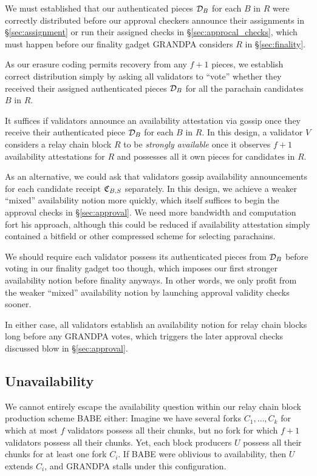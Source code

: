 We must established that our authenticated pieces $\mathcal{D}_B$ for each $B$ in $R$ were correctly distributed before our approval checkers announce their assignments in \S\ref{sec:assignment} or run their assigned checks in \S\ref{sec:approcal_checks}, which must happen before our finality gadget GRANDPA considers $R$ in \S\ref{sec:finality}.  

As our erasure coding permits recovery from any $f+1$ pieces, we establish correct distribution simply by asking all validators to ``vote'' whether they received their assigned authenticated pieces $\mathcal{D}_B$ for all the parachain candidates $B$ in $R$. 

It suffices if validators announce an availability attestation via gossip once they receive their authenticated piece $\mathcal{D}_B$ for each $B$ in $R$.  In this design, a validator $V$ considers a relay chain block $R$ to be {\em strongly available} once it observes $f+1$ availability attestations for $R$ and possesses all it own pieces for candidates in $R$.

As an alternative, we could ask that validators gossip availability announcements for each candidate receipt $\mathfrak{C}_{B,S}$ separately.  In this design, we achieve a weaker ``mixed'' availability notion more quickly, which itself suffices to begin the approval checks in \S\ref{sec:approval}.  We need more bandwidth and computation fort his approach, although this could be reduced if availability attestation simply contained a bitfield or other compressed scheme for selecting parachains.

We should require each validator possess its authenticated pieces from $\mathcal{D}_B$ before voting in our finality gadget too though, which imposes our first stronger availability notion before finality anyways.  In other words, we only profit from the weaker ``mixed'' availability notion by launching approval validity checks sooner.

In either case, all validators establish an availability notion for relay chain blocks long before any GRANDPA votes, which triggers the later approval checks discussed blow in \S\ref{sec:approval}.


\subsection{Unavailability}
\label{sec:unavailability} %

We cannot entirely escape the availability question within our relay chain block production scheme BABE either:  Imagine we have several forks $C_1,\ldots,C_k$ for which at most $f$ validators possess all their chunks, but no fork for which $f+1$ validators possess all their chunks.  Yet, each block producers $U$ possess all their chunks for at least one fork $C_i$.  If BABE were oblivious to availability, then $U$ extends $C_i$, and GRANDPA stalls under this configuration. 

